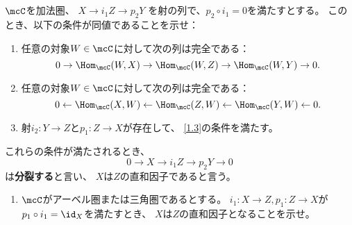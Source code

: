 \documentclass[uplatex,dvipdfmx]{jsarticle}
\begin{document}
\maketitle
\HeaderCommentA
\section{}
\fi


\begin{prob}\label{1.4}
  \(\mcC\)を加法圏、
  \(X\rightarrow{i_1} Z \rightarrow{p_2} Y\)
  を射の列で、\(p_2\circ i_1 = 0\)を満たすとする。
  このとき、以下の条件が同値であることを示せ：
  \begin{enumerate}
    \item \label{1.4.1}
    任意の対象\(W\in \mcC\)に対して次の列は完全である：
    \[
    0 \to \Hom_{\mcC}(W,X) \to \Hom_{\mcC}(W,Z) \to \Hom_{\mcC}(W,Y) \to 0.
    \]
    \item \label{1.4.2}
    任意の対象\(W\in \mcC\)に対して次の列は完全である：
    \[
    0 \gets \Hom_{\mcC}(X,W) \gets \Hom_{\mcC}(Z,W) \gets \Hom_{\mcC}(Y,W) \gets 0.
    \]
    \item \label{1.4.3}
    射\(i_2:Y\to Z\)と\(p_1:Z\to X\)が存在して、
    \autoref{1.3}の条件を満たす。
  \end{enumerate}
  これらの条件が満たされるとき、
  \[ 0\to X\rightarrow{i_1} Z \rightarrow{p_2} Y \to 0 \]
  は\textbf{分裂する}と言い、
  \(X\)は\(Z\)の直和因子であると言う。
  \begin{enumerate}[label=(\fnsymbol*),start=2]
    \item \label{1.4.4}
    \(\mcC\)がアーベル圏または三角圏であるとする。
    \(i_1:X\to Z, p_1:Z\to X\)が
    \(p_1\circ i_1 = \id_X\)を満たすとき、
    \(X\)は\(Z\)の直和因子となることを示せ。
  \end{enumerate}
\end{prob}
\end{document}
